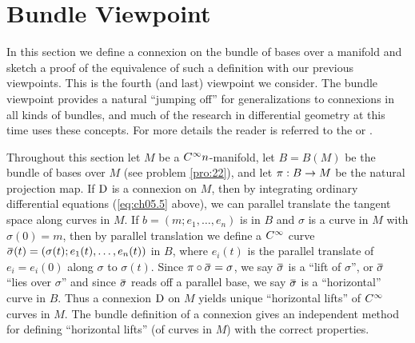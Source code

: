 \documentclass[../main]{subfiles}
\begin{document}
\section{Bundle Viewpoint}\label{ch05:s5}

In this section we define a connexion on the bundle of bases over a manifold and sketch a proof of the equivalence of such a definition with our previous viewpoints. This is the fourth (and last) viewpoint we consider. The bundle viewpoint provides a natural ``jumping off'' for generalizations to connexions in all kinds of bundles, and much of the research in differential geometry at this time uses these concepts. For more details the reader is referred to the  \cite{bishop2011geometry} or \cite{kobayashi1963foundations}.

Throughout this section let $M$ be a $C^\infty n$-manifold, let $B=B(M)$ be the bundle of bases over $M$ (see problem \ref{pro:22}), and let $\pi: B \to M$ be the natural projection map. If $\mathrm{D}$ is a connexion on $M$, then by integrating ordinary differential equations (\ref{eq:ch05.5} above), we can parallel translate the tangent space along curves in $M$. If $b=\left(m ; e_{1}, \ldots, e_{n}\right)$ is in $B$ and $\sigma$ is a curve in $M$ with $\sigma(0)=m$, then by parallel translation we define a $C^\infty$ curve $\xoverline{\sigma}(t)=\left(\sigma(t) ; e_{1}(t), \ldots, e_{n}(t)\right)$ in $B$, where $e_i(t)$ is the parallel translate of $e_{i}=e_{i}(0)$ along $\sigma$ to $\sigma(t)$. Since $\pi \circ \xoverline{\sigma}=\sigma$, we say $\xoverline{\sigma}$ is a ``lift of $\sigma$'', or $\xoverline{\sigma}$ ``lies over $\sigma$'' and since $\xoverline{\sigma}$ reads off a parallel base, we say $\xoverline{\sigma}$ is a ``horizontal'' curve in $B$. Thus a connexion $\mathrm{D}$ on $M$ yields unique ``horizontal lifts'' of $C^\infty$ curves in $M$. The bundle definition of a connexion gives an independent method for defining ``horizontal lifts'' (of curves in $M$) with the correct properties.
\end{document}
